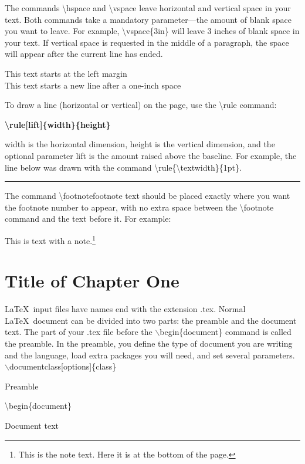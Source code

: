 \documentclass[12pt,openright]{book}
\begin{document}
The commands \textbackslash hspace and \textbackslash vspace leave horizontal and vertical space in your text. Both commands take a mandatory parameter—the amount of blank space you want to leave. For example, \textbackslash vspace\{3in\} will leave 3 inches of blank space in your text. If vertical space is requested in the middle of a paragraph, the space will appear after the current line has ended.

This text starts at the left margin\\
\hspace*{1in}This text starts a new line after a one-inch space

To draw a line (horizontal or vertical) on the page, use the \textbackslash rule command:

\textbf{\textbackslash rule[lift]\{width\}\{height\}}

width is the horizontal dimension, height is the vertical dimension, and the optional
parameter lift is the amount raised above the baseline. For example, the line below was
drawn with the command \textbackslash rule\{\textbackslash textwidth\}\{1pt\}.

\rule{\textwidth}{1pt}

The command \textbackslash footnote{footnote text} should be placed exactly where you want the footnote number to appear, with no extra space between the \textbackslash footnote command and the text before it. For example: 

This is text with a note.\footnote{This is the note text. Here it is at the bottom of the page.}

\mainmatter
\chapter{Title of Chapter One}

\LaTeX\ input files have names end with the extension .tex. Normal \LaTeX\ document can be divided into two parts: the preamble and the document text. The part of your .tex file before the $\backslash$begin\{document\} command is called the preamble. In the preamble, you define the type of document you are writing and the language, load extra packages you will need, and set several parameters. 
\vskip 0.2in
$\backslash$documentclass[options]\{class\}

Preamble

\textbackslash begin\{document\}

Document text
  
\end{document}
